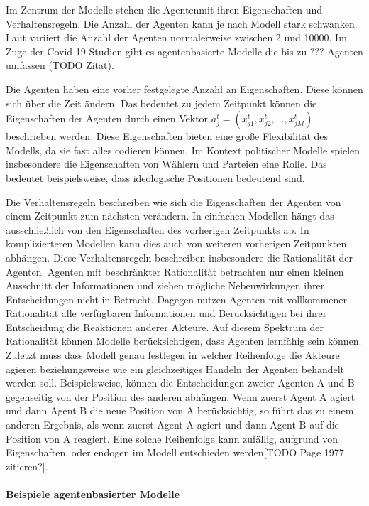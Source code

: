 Im Zentrum der Modelle stehen die Agentenmit ihren Eigenschaften und Verhaltensregeln. Die Anzahl der Agenten kann je nach Modell stark schwanken. Laut \citet{marchi2014ABMs} variiert die Anzahl der Agenten normalerweise zwischen 2 und 10000. Im Zuge der Covid-19 Studien gibt es agentenbasierte Modelle die bis zu ??? Agenten umfassen (TODO Zitat).

Die Agenten haben eine vorher festgelegte Anzahl an Eigenschaften. Diese können sich über die Zeit ändern. Das bedeutet zu jedem Zeitpunkt können die Eigenschaften der Agenten durch einen Vektor $a_j^t = (x_{j1}^t, x_{j2}^t,..., x_{jM}^t)$ beschrieben werden. Diese Eigenschaften bieten eine große Flexibilität des Modells, da sie fast alles codieren können. Im Kontext politischer Modelle spielen insbesondere die Eigenschaften von Wählern und Parteien eine Rolle. Das bedeutet beispielsweise, dass ideologische Positionen bedeutend sind.

Die Verhaltensregeln beschreiben wie sich die Eigenschaften der Agenten von einem Zeitpunkt zum nächsten verändern. In einfachen Modellen hängt das ausschließlich von den Eigenschaften des vorherigen Zeitpunkts ab. In komplizierteren Modellen kann dies auch von weiteren vorherigen Zeitpunkten abhängen. Diese Verhaltensregeln beschreiben insbesondere die Rationalität der Agenten. Agenten mit beschränkter Rationalität betrachten nur einen kleinen Ausschnitt der Informationen und ziehen mögliche Nebenwirkungen ihrer Entscheidungen nicht in Betracht. Dagegen nutzen Agenten mit vollkommener Rationalität alle verfügbaren Informationen und Berücksichtigen bei ihrer Entscheidung die Reaktionen anderer Akteure. Auf diesem Spektrum der Rationalität können Modelle berücksichtigen, dass Agenten lernfähig sein können. Zuletzt muss dass Modell genau festlegen in welcher Reihenfolge die Akteure agieren beziehungsweise wie ein gleichzeitiges Handeln der Agenten behandelt werden soll. Beispielsweise, können die Entscheidungen zweier Agenten A und B gegenseitig von der Position des anderen abhängen. Wenn zuerst Agent A agiert und dann Agent B die neue Position von A berücksichtig, so führt das zu einem anderen Ergebnis, als wenn zuerst Agent A agiert und dann Agent B auf die Position von A reagiert. Eine solche Reihenfolge kann zufällig, aufgrund von Eigenschaften, oder endogen im Modell entschieden werden[TODO Page 1977 zitieren?].

\paragraph{Beispiele agentenbasierter Modelle}

